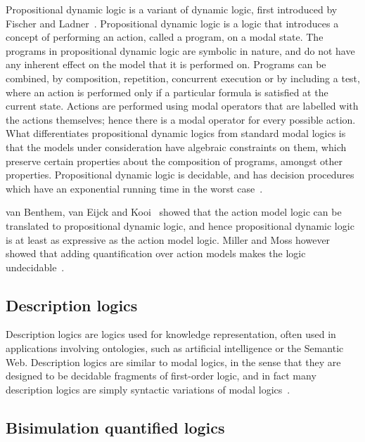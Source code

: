 Propositional dynamic logic is a variant of dynamic logic, first introduced by
Fischer and Ladner~\cite{fischer1979propositional}. Propositional dynamic logic
is a logic that introduces a concept of performing an action, called a program,
on a modal state. The programs in propositional dynamic logic are symbolic in
nature, and do not have any inherent effect on the model that it is performed
on. Programs can be combined, by composition, repetition, concurrent execution
or by including a test, where an action is performed only if a particular
formula is satisfied at the current state. Actions are performed using modal
operators that are labelled with the actions themselves; hence there is a modal
operator for every possible action. What differentiates propositional dynamic
logics from standard modal logics is that the models under consideration have
algebraic constraints on them, which preserve certain properties about the
composition of programs, amongst other properties. Propositional dynamic logic
is decidable, and has decision procedures which have an exponential running time
in the worst case~\cite{pratt1980near}.

van Benthem, van Eijck and Kooi~\cite{vanbenthem2006logics} showed that the
action model logic can be translated to propositional dynamic logic, and hence
propositional dynamic logic is at least as expressive as the action model logic.
Miller and Moss however showed that adding quantification over action models
makes the logic undecidable~\cite{miller2005undecidability}.

\subsection{Description logics}

Description logics are logics used for knowledge representation, often used in
applications involving ontologies, such as artificial intelligence or the
Semantic Web. Description logics are similar to modal logics, in the sense that
they are designed to be decidable fragments of first-order logic, and in fact
many description logics are simply syntactic variations of modal
logics~\cite{blackburn2002modal}.

\subsection{Bisimulation quantified logics}



